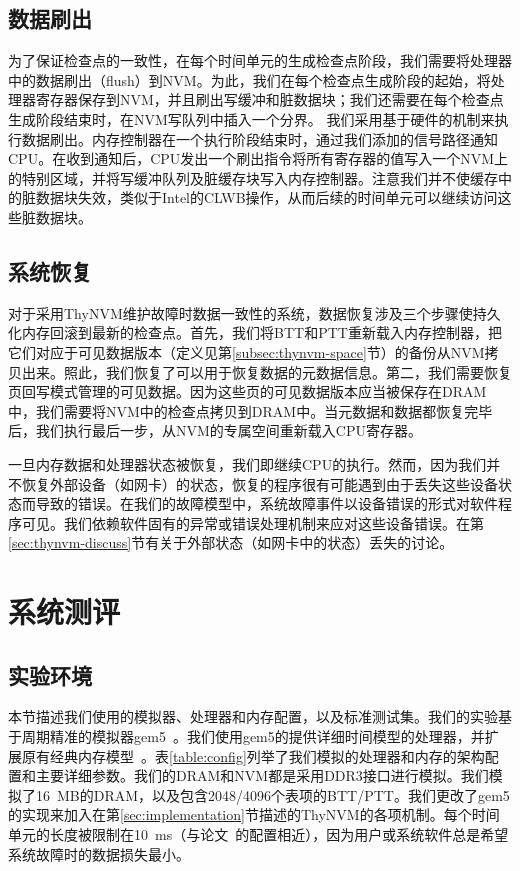 \subsection{数据刷出}
\label{subsec:data-flush}

为了保证检查点的一致性，在每个时间单元的生成检查点阶段，我们需要将处理器中的数据刷出（flush）到NVM。为此，我们在每个检查点生成阶段的起始，将处理器寄存器保存到NVM，并且刷出写缓冲和脏数据块；我们还需要在每个检查点生成阶段结束时，在NVM写队列中插入一个分界。 
我们采用基于硬件的机制来执行数据刷出。内存控制器在一个执行阶段结束时，通过我们添加的信号路径通知CPU。在收到通知后，CPU发出一个刷出指令将所有寄存器的值写入一个NVM上的特别区域，并将写缓冲队列及脏缓存块写入内存控制器。注意我们并不使缓存中的脏数据块失效，类似于Intel的CLWB操作，从而后续的时间单元可以继续访问这些脏数据块。

\subsection{系统恢复}
\label{subsec:system-recovery}
对于采用ThyNVM维护故障时数据一致性的系统，数据恢复涉及三个步骤使持久化内存回滚到最新的检查点。首先，我们将BTT和PTT重新载入内存控制器，把它们对应于可见数据版本（定义见第\ref{subsec:thynvm-space}节）的备份从NVM拷贝出来。照此，我们恢复了可以用于恢复数据的元数据信息。第二，我们需要恢复页回写模式管理的可见数据。因为这些页的可见数据版本应当被保存在DRAM中，我们需要将NVM中的检查点拷贝到DRAM中。当元数据和数据都恢复完毕后，我们执行最后一步，从NVM的专属空间重新载入CPU寄存器。 

一旦内存数据和处理器状态被恢复，我们即继续CPU的执行。然而，因为我们并不恢复外部设备（如网卡）的状态，恢复的程序很有可能遇到由于丢失这些设备状态而导致的错误。在我们的故障模型中，系统故障事件以设备错误的形式对软件程序可见。我们依赖软件固有的异常或错误处理机制来应对这些设备错误。在第\ref{sec:thynvm-discuss}节有关于外部状态（如网卡中的状态）丢失的讨论。 

\section{系统测评}
\label{sec:thynvm-eval}

\subsection{实验环境}

本节描述我们使用的模拟器、处理器和内存配置，以及标准测试集。我们的实验基于周期精准的模拟器gem5~\cite{Binkert:2011:GS:2024716.2024718}。我们使用gem5的提供详细时间模型的处理器，并扩展原有经典内存模型~\cite{6844484}。表\ref{table:config}列举了我们模拟的处理器和内存的架构配置和主要详细参数。我们的DRAM和NVM都是采用DDR3接口进行模拟。我们模拟了16~MB的DRAM，以及包含2048/4096个表项的BTT/PTT。我们更改了gem5的实现来加入在第\ref{sec:implementation}节描述的ThyNVM的各项机制。每个时间单元的长度被限制在10~ms（与论文~\cite{1003567, 1003568}的配置相近），因为用户或系统软件总是希望系统故障时的数据损失最小。 

